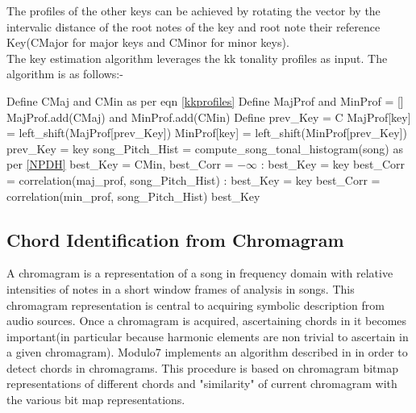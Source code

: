 \noindent The profiles of the other keys can be achieved by rotating the vector by the intervalic distance of the root notes of the key and root note their reference Key(CMajor for major keys and CMinor for minor keys). \\

\noindent The key estimation algorithm leverages the kk tonality profiles as input. The algorithm is as follows:-

\begin{algorithm}

\label{CHalgorithm}
\begin{algorithmic}[1]
 {}
\State Define CMaj and CMin as per eqn \ref{kkprofiles}
\State Define MajProf and MinProf = [] %
\State MajProf.add(CMaj) and MinProf.add(CMin)
\State Define prev\_Key = C 
\State MajProf[key] = left\_shift(MajProf[prev\_Key])
\State MinProf[key] = left\_shift(MinProf[prev\_Key])
\State prev\_Key = key
\EndFor
\State song\_Pitch\_Hist = compute\_song\_tonal\_histogram(song) as per \ref{NPDH}
\State best\_Key = CMin, best\_Corr = $-\infty$
:
\State best\_Key = key
\State best\_Corr = correlation(maj\_prof, song\_Pitch\_Hist)
\EndIf
\EndFor
{}:
\State best\_Key = key
\State best\_Corr = correlation(min\_prof, song\_Pitch\_Hist)
\EndIf
\EndFor
\Return best\_Key
\EndProcedure
\end{algorithmic}
\end{algorithm}

\subsection{Chord Identification from Chromagram}

\noindent A chromagram \cite{chromagramtutorial} is a representation of a song in frequency domain with relative intensities of notes in a short window frames of analysis in songs. This chromagram representation is central to acquiring symbolic description from audio sources. Once a chromagram is acquired, ascertaining chords in it becomes important(in particular because harmonic elements are non trivial to ascertain in a given chromagram). Modulo7 implements an algorithm described in \cite{chord-detection} in order to detect chords in chromagrams. This procedure is based on chromagram bitmap representations of different chords and "similarity" of current chromagram with the various bit map representations. \\

